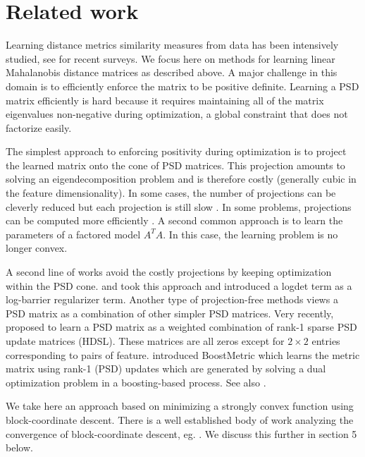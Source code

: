 \documentclass{article} %
\begin{document}
\section{Related work}
Learning distance metrics similarity measures from data has been intensively studied,  see \citet{bellet2013survey, kulis2012survey} for recent surveys. We focus here on methods for learning linear Mahalanobis distance matrices as described above. A major challenge in this domain is to efficiently enforce the matrix to be positive definite. Learning a PSD matrix efficiently is hard because it requires maintaining all of the matrix eigenvalues non-negative during optimization, a global constraint that does not factorize easily.

The simplest approach to enforcing positivity during optimization is to project the learned matrix onto the cone of PSD matrices. This projection amounts to solving an eigendecomposition problem and is therefore costly (generally cubic in the feature dimensionality). In some cases, the number of projections can be cleverly reduced but each projection is still slow \cite{qianHD, qian}. In some problems, projections can be computed more efficiently \cite{shalev2004online}. A second common approach is to learn the parameters of a factored model $A^TA$. In this case, the learning problem is no longer convex. 

A second line of works avoid the costly projections by keeping optimization within the PSD cone.   \citet{davis2007information} and \citet{lego} took this approach and introduced a logdet term as a log-barrier regularizer term. Another type of projection-free methods views a PSD matrix as a combination of other simpler PSD matrices. Very recently, \citet{hdsl} proposed to learn a PSD matrix as a weighted combination of rank-1 sparse PSD update matrices (HDSL). These matrices are all zeros except for $2\times2$ entries corresponding to pairs of feature. \citet{boost} introduced BoostMetric which learns the metric matrix using rank-1 (PSD) updates which are generated by solving a dual optimization problem in a boosting-based process. See also \citet{bi2011adaboost, liu2012robust}.

We take here an approach based on minimizing a strongly convex function using block-coordinate descent. There is a well established body of work analyzing the convergence of block-coordinate descent, eg. \cite{nesterov2012efficiency,richtarik2014iteration}. We discuss this further in section 5 below.


\end{document}
